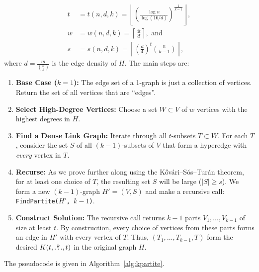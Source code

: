 \begin{align*}
    t &= t(n, d, k) = \left\lfloor \left( \frac{\log n}{\log (16/d)}  \right)^{\frac{1}{k-1}} \right \rfloor, \\
    w &= w(n, d, k) = \left\lceil \frac{4 t}{d} \right\rceil, \text{ and } \\
    s &= s(n, d, k) = \left\lceil \left( \frac{d}{4} \right)^t \binom{n}{k-1} \right\rceil,
\end{align*}
where $d = \frac{m}{\binom{n}{k}}$ is the edge density of $H$.
The main steps are:
\begin{enumerate}
    \item \textbf{Base Case ($k=1$):} The edge set of a 1-graph is just a collection of vertices.
    Return the set of all vertices that are ``edges''.

    \item \textbf{Select High-Degree Vertices:} Choose a set $W \subset V$ of $w$ vertices with the highest degrees in $H$. \label{W}

    \item \textbf{Find a Dense Link Graph:} Iterate through all $t$-subsets $T \subset W$.
    For each $T$, consider the set $S$ of all $(k-1)$-subsets of $V$ that form a hyperedge with \emph{every} vertex in $T$. \label{link}

    \item \textbf{Recurse:} As we prove further along using the Kőv\'{a}ri–S\'{o}s–Tur\'{a}n theorem, for at least one choice of $T$,
    the resulting set $S$ will be large ($|S| \ge s$). We form a new $(k-1)$-graph $H'=(V, S)$ and make a recursive call: \texttt{FindPartite($H'$, $k-1$)}.

    \item \textbf{Construct Solution:} The recursive call returns $k-1$ parts $V_1, \dots, V_{k-1}$ of size at least $t$.
    By construction, every choice of vertices from these parts forms an edge in $H'$ with every vertex of $T$.
    Thus, $(T_1, \dots, T_{k-1}, T)$ form the desired $K(t, \overset{k}{\dots}, t)$ in the original graph $H$.

\end{enumerate}

The pseudocode is given in Algorithm~\ref{alg:kpartite}.

